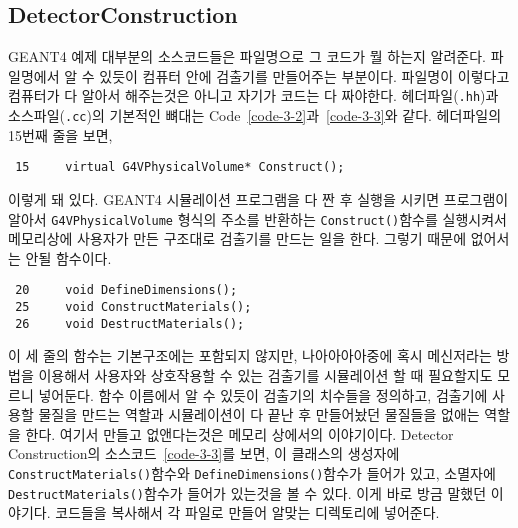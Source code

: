 \subsection{DetectorConstruction}
GEANT4 예제 대부분의 소스코드들은 파일명으로 그 코드가 뭘 하는지 알려준다.
파일명에서 알 수 있듯이 컴퓨터 안에 검출기를 만들어주는 부분이다. 파일명이
이렇다고 컴퓨터가 다 알아서 해주는것은 아니고 자기가 코드는 다 짜야한다.
헤더파일(\texttt{.hh})과 소스파일(\texttt{.cc})의 기본적인 뼈대는
Code~\ref{code-3-2}과~\ref{code-3-3}와 같다. 헤더파일의 15번째 줄을 보면,
\begin{pc}
\begin{lstlisting}
 15     virtual G4VPhysicalVolume* Construct();
\end{lstlisting}
\end{pc}
이렇게 돼 있다. GEANT4 시뮬레이션 프로그램을 다 짠 후 실행을 시키면 프로그램이
알아서 \texttt{G4VPhysicalVolume} 형식의 주소를 반환하는 \texttt{Construct()}함수를
실행시켜서 메모리상에 사용자가 만든 구조대로 검출기를 만드는 일을 한다.
그렇기 때문에 없어서는 안될 함수이다.
\begin{pc}
\begin{lstlisting}
 20     void DefineDimensions();
 25     void ConstructMaterials();
 26     void DestructMaterials();
\end{lstlisting}
\end{pc}
이 세 줄의 함수는 기본구조에는 포함되지 않지만, 나아아아아중에 혹시 메신저라는
방법을 이용해서 사용자와 상호작용할 수 있는 검출기를 시뮬레이션 할 때
필요할지도 모르니 넣어둔다. 함수 이름에서 알 수 있듯이 검출기의 치수들을
정의하고, 검출기에 사용할 물질을 만드는 역할과 시뮬레이션이 다 끝난 후
만들어놨던 물질들을 없애는 역할을 한다. 여기서 만들고 없앤다는것은 메모리
상에서의 이야기이다. Detector Construction의 소스코드~\ref{code-3-3}를 보면, 이
클래스의 생성자에 \texttt{ConstructMaterials()}함수와
\texttt{DefineDimensions()}함수가 들어가 있고, 소멸자에
\texttt{DestructMaterials()}함수가 들어가 있는것을 볼 수 있다. 이게 바로
방금 말했던 이야기다. 코드들을 복사해서 각 파일로 만들어 알맞는 디렉토리에
넣어준다. 

